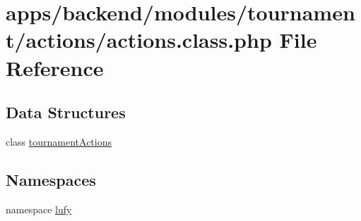 \hypertarget{backend_2modules_2tournament_2actions_2actions_8class_8php}{\section{apps/backend/modules/tournament/actions/actions.class.\-php File Reference}
\label{backend_2modules_2tournament_2actions_2actions_8class_8php}
}
\subsection*{Data Structures}
\begin{DoxyCompactItemize}
\item 
class \hyperlink{classtournament_actions}{tournament\-Actions}
\end{DoxyCompactItemize}
\subsection*{Namespaces}
\begin{DoxyCompactItemize}
\item 
namespace \hyperlink{namespacelufy}{lufy}
\end{DoxyCompactItemize}
